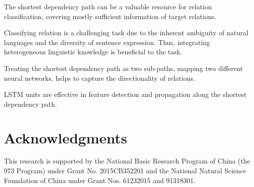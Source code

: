 \documentclass[11pt,a4paper]{article}
\begin{document}
\begin{compactitem}
\item The shortest dependency path can be a valuable resource for relation classification, 
covering mostly sufficient information of target relations.

\item Classifying relation is a challenging task due to the inherent ambiguity of natural languages and the diversity of sentence expression. Thus, 
integrating heterogeneous linguistic knowledge is beneficial to the task.

\item Treating the shortest dependency path as two sub-paths, mapping two different neural networks, helps to capture the directionality of relations.

\item LSTM units are effective in feature detection and propagation along the shortest dependency path.

\end{compactitem}

\section*{Acknowledgments}
This research is supported by the National Basic Research Program of China (the 973 Program) under Grant No. 2015CB352201 and the National Natural Science Foundation of China under Grant Nos. 61232015 and 91318301.




\end{document}
